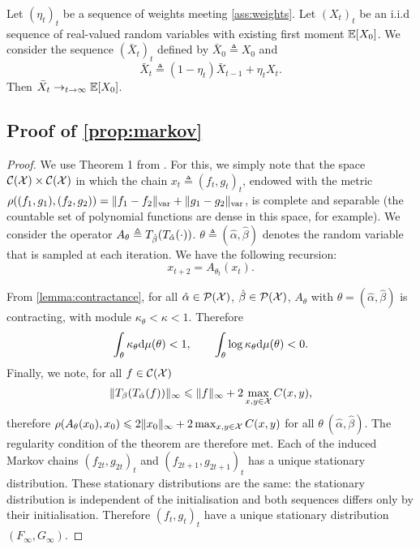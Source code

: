 \begin{lemma}\label{lemma:running}
    Let $(\eta_t)_t$ be a sequence of weights meeting \autoref{ass:weights}. Let
    $(X_t)_t$ be an i.i.d sequence of real-valued random variables with existing
    first moment $\mathbb{E}[X_0]$. We consider the sequence ${(\bar X_t)}_t$ defined
    by $\bar X_0 \triangleq X_0$ and 
    \begin{equation}
        \bar X_t \triangleq (1 - \eta_t) \bar X_{t-1} + \eta_t X_t.
    \end{equation}
    Then $\bar X_t \to_{t \to \infty} \mathbb{E}[X_0]$.
\end{lemma}

\subsection{Proof of \autoref{prop:markov}}

\begin{proof}
    We use Theorem 1 from \citet{diaconis_iterated}. For this, we simply note
    that the space $\mathcal{C}(\mathcal{X}) \times \mathcal{C}(\mathcal{X})$ in which the chain ${x_t
    \triangleq (f_t, g_t)}_t$, endowed with the metric $\rho((f_1, g_1), (f_2,
    g_2)) = \Vert f_1 - f_2 \Vert_{\text{\upshape var}} + \Vert g_1 - g_2 \Vert_{\text{\upshape var}}$, is
    complete and separable (the countable set of polynomial functions are dense in this space, for example).
    We consider the operator $A_{\theta} \triangleq T_{\hat \beta}(T_{\hat
    \alpha}(\cdot))$. $\theta \triangleq (\hat \alpha, \hat \beta)$ denotes
    the random variable that is sampled at each iteration. We have the following
    recursion:
    \begin{equation}
        x_{t+2} = A_{\theta_t}(x_t).
    \end{equation}
    
    From \autoref{lemma:contractance}, for all $\hat \alpha \in \mathcal{P}(\mathcal{X})$, $\hat \beta \in \mathcal{P}(\mathcal{X})$, $A_{\theta}$
    with $\theta = (\hat \alpha, \hat \beta)$ is contracting, with module
    $\kappa_\theta < \kappa < 1$. Therefore
    \begin{equation}
        \int_{\theta} \kappa_\theta \textrm{d} \mu(\theta) < 1, \qquad \int_{\theta}
         \log \kappa_\theta \textrm{d} \mu(\theta) < 0.
    \end{equation}
    Finally, we note, for all $f \in \mathcal{C}(\mathcal{X})$
    \begin{equation}
        \Vert T_{\beta}(T_{\hat \alpha}(f)) \Vert_{\infty} 
        \leqslant \Vert f \Vert_\infty + 2 \max_{x,y \in \mathcal{X}} C(x, y),
    \end{equation}
    therefore $\rho(A_\theta(x_0), x_0) \leqslant 2 \Vert x_0 \Vert_\infty + 2
    \max_{x,y \in \mathcal{X}} C(x, y)$ for all $\theta \ (\hat \alpha, \hat \beta)$.
    The regularity condition of the theorem are therefore met. Each of the
    induced Markov chains ${(f_{2t}, g_{2t})}_t$ and ${(f_{2t + 1}, g_{2t +
    1})}_t$ has a unique stationary distribution. These stationary distributions
    are the same: the stationary distribution is independent of the
    initialisation and both sequences differs only by their initialisation.
    Therefore ${(f_{t}, g_{t})}_t$ have a unique stationary distribution
    $(F_\infty, G_\infty)$.
\end{proof}

